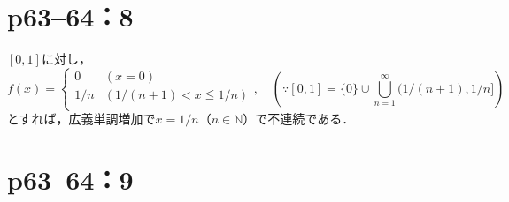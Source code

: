 \documentclass[a4paper,10pt,fleqn]{ltjsarticle}
\begin{document}
\section*{p63--64：8}
\begin{leftbar}
    $ [0,1]$に対し，
    \[
        f(x)= \begin{cases}
            0   & (x=0)                   \\
            1/n & (1/(n+1) < x \leqq 1/n) \\
        \end{cases}
        ,\quad \left ( \because [0,1] = \{ 0 \} \cup \bigcup_{n=1}^{\infty} (1/(n+1),1/n] \right )
    \]
    とすれば，広義単調増加で$x=1/n$（$n \in \mathbb{N}$）で不連続である．
\end{leftbar}
\newpage

\section*{p63--64：9}
\end{document}

